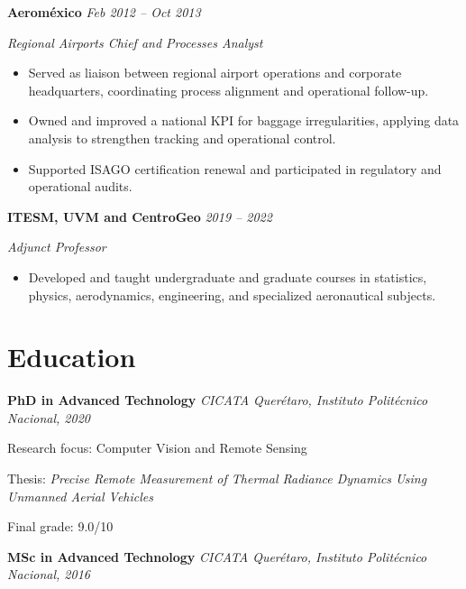 \documentclass[10pt]{article}
\begin{document}
\textbf{Aerom\'exico}
\hfill
\textit{Feb 2012 -- Oct 2013}

\textit{Regional Airports Chief and Processes Analyst}

\begin{itemize}
    \item Served as liaison between regional airport operations and corporate
    headquarters, coordinating process alignment and operational follow-up.

    \item Owned and improved a national KPI for baggage irregularities,
    applying data analysis to strengthen tracking and operational control.

    \item Supported ISAGO certification renewal and participated in
    regulatory and operational audits.
\end{itemize}

\textbf{ITESM, UVM and CentroGeo}
\hfill
\textit{2019 -- 2022}

\textit{Adjunct Professor}

\begin{itemize}
    \item Developed and taught undergraduate and graduate courses in
    statistics, physics, aerodynamics, engineering, and specialized
    aeronautical subjects.
\end{itemize}

\newpage


\section*{Education}

\textbf{PhD in Advanced Technology}
\hfill
\textit{CICATA Quer\'etaro, Instituto Polit\'ecnico Nacional, 2020}

Research focus: Computer Vision and Remote Sensing

Thesis: \textit{Precise Remote Measurement of Thermal Radiance Dynamics
Using Unmanned Aerial Vehicles}

Final grade: 9.0/10

\vspace{4pt}

\textbf{MSc in Advanced Technology}
\hfill
\textit{CICATA Quer\'etaro, Instituto Polit\'ecnico Nacional, 2016}
\end{document}
